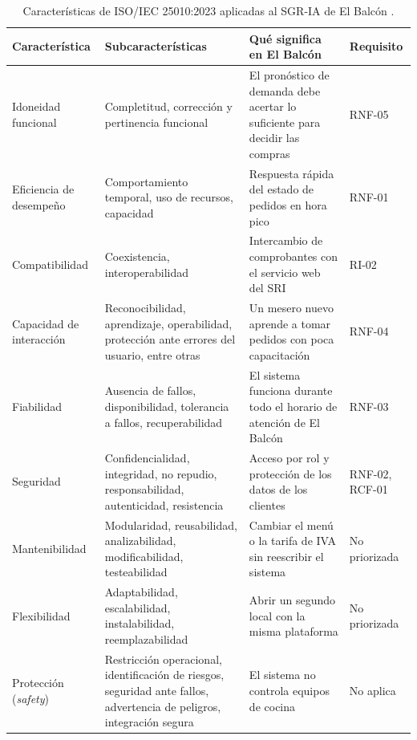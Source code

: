 \begin{table}[ht]
\centering
\small
\caption{Caracter\'isticas de ISO/IEC 25010:2023 aplicadas al SGR-IA de El Balc\'on \cite{iso25010}.}
\label{tab:iso}
\begin{tabular}{@{}>{\raggedright\arraybackslash}p{2.6cm}>{\raggedright\arraybackslash}p{4.3cm}>{\raggedright\arraybackslash}p{5.2cm}>{\raggedright\arraybackslash}p{2.2cm}@{}}
\toprule
\textbf{Caracter\'istica} & \textbf{Subcaracter\'isticas} & \textbf{Qu\'e significa en El Balc\'on} & \textbf{Requisito} \\
\midrule
Idoneidad funcional & Completitud, correcci\'on y pertinencia funcional & El pron\'ostico de demanda debe acertar lo suficiente para decidir las compras & RNF-05 \\
Eficiencia de desempe\~no & Comportamiento temporal, uso de recursos, capacidad & Respuesta r\'apida del estado de pedidos en hora pico & RNF-01 \\
Compatibilidad & Coexistencia, interoperabilidad & Intercambio de comprobantes con el servicio web del SRI & RI-02 \\
Capacidad de interacci\'on & Reconocibilidad, aprendizaje, operabilidad, protecci\'on ante errores del usuario, entre otras & Un mesero nuevo aprende a tomar pedidos con poca capacitaci\'on & RNF-04 \\
Fiabilidad & Ausencia de fallos, disponibilidad, tolerancia a fallos, recuperabilidad & El sistema funciona durante todo el horario de atenci\'on de El Balc\'on & RNF-03 \\
Seguridad & Confidencialidad, integridad, no repudio, responsabilidad, autenticidad, resistencia & Acceso por rol y protecci\'on de los datos de los clientes & RNF-02, RCF-01 \\
Mantenibilidad & Modularidad, reusabilidad, analizabilidad, modificabilidad, testeabilidad & Cambiar el men\'u o la tarifa de IVA sin reescribir el sistema & No priorizada \\
Flexibilidad & Adaptabilidad, escalabilidad, instalabilidad, reemplazabilidad & Abrir un segundo local con la misma plataforma & No priorizada \\
Protecci\'on (\emph{safety}) & Restricci\'on operacional, identificaci\'on de riesgos, seguridad ante fallos, advertencia de peligros, integraci\'on segura & El sistema no controla equipos de cocina & No aplica \\
\bottomrule
\end{tabular}
\end{table}

